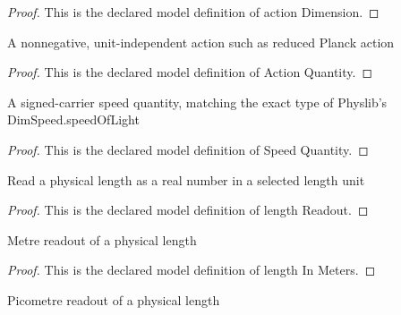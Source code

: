 \begin{proof}
  This is the declared model definition of action Dimension.
\end{proof}
\begin{definition}
  \label{def:physics:phyx-mini-0631:phyxminiproblems-problemphyxmini0631-actionquantity}
  A nonnegative, unit-independent action such as reduced Planck action
\end{definition}
\begin{proof}
  This is the declared model definition of Action Quantity.
\end{proof}
\begin{definition}
  \label{def:physics:phyx-mini-0631:phyxminiproblems-problemphyxmini0631-speedquantity}
  A signed-carrier speed quantity, matching the exact type of Physlib's DimSpeed.speedOfLight
\end{definition}
\begin{proof}
  This is the declared model definition of Speed Quantity.
\end{proof}
\begin{definition}
  \label{def:physics:phyx-mini-0631:phyxminiproblems-problemphyxmini0631-lengthreadout}
  Read a physical length as a real number in a selected length unit
\end{definition}
\begin{proof}
  This is the declared model definition of length Readout.
\end{proof}
\begin{definition}
  \label{def:physics:phyx-mini-0631:phyxminiproblems-problemphyxmini0631-lengthinmeters}
  Metre readout of a physical length
\end{definition}
\begin{proof}
  This is the declared model definition of length In Meters.
\end{proof}
\begin{definition}
  \label{def:physics:phyx-mini-0631:phyxminiproblems-problemphyxmini0631-lengthinpicometers}
  Picometre readout of a physical length
\end{definition}
